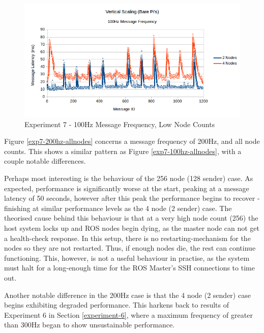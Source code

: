 \documentclass[../dissertation.tex]{subfiles}
\begin{document}
\begin{figure}[H]
\centering
\includegraphics[width=\textwidth]{images/experiment7/vertical_scaling_100hz_low_node_counts.png}
\caption{Experiment 7 - 100Hz Message Frequency, Low Node Counts}
\label{exp7-100hz-lownodes}
\end{figure}

Figure \ref{exp7-200hz-allnodes} concerns a message frequency of 200Hz, and all node counts. This shows a similar pattern as Figure \ref{exp7-100hz-allnodes}, with a couple notable differences.

Perhaps most interesting is the behaviour of the 256 node (128 sender) case. As expected, performance is significantly worse at the start, peaking at a message latency of 50 seconds, however after this peak the performance begins to recover - finishing at similar performance levels as the 4 node (2 sender) case. The theorised cause behind this behaviour is that at a very high node count (256) the host system locks up and ROS nodes begin dying, as the master node can not get a health-check response. In this setup, there is no restarting-mechanism for the nodes so they are not restarted. Thus, if enough nodes die, the rest can continue functioning. This, however, is not a useful behaviour in practise, as the system must halt for a long-enough time for the ROS Master's SSH connections to time out.

Another notable difference in the 200Hz case is that the 4 node (2 sender) case begins exhibiting degraded performance. This harkens back to results of Experiment 6 in Section \ref{experiment-6}, where a maximum frequency of greater than 300Hz began to show unsustainable performance.
\end{document}
